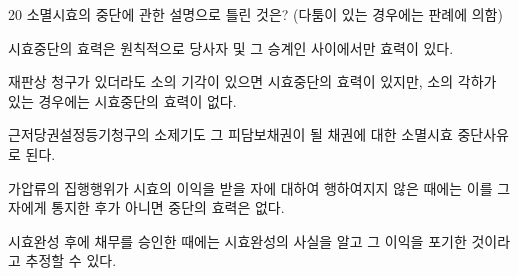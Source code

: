\begin{question}{20}
소멸시효의 중단에 관한 설명으로 틀린 것은? (다툼이 있는 경우에는 판례에 의함)
\begin{choices}
  \item 시효중단의 효력은 원칙적으로 당사자 및 그 승계인 사이에서만 효력이 있다.
  \item 재판상 청구가 있더라도 소의 기각이 있으면 시효중단의 효력이 있지만, 소의 각하가 있는 경우에는 시효중단의 효력이 없다.
  \item 근저당권설정등기청구의 소제기도 그 피담보채권이 될 채권에 대한 소멸시효 중단사유로 된다.
  \item 가압류의 집행행위가 시효의 이익을 받을 자에 대하여 행하여지지 않은 때에는 이를 그 자에게 통지한 후가 아니면 중단의 효력은 없다.
  \item 시효완성 후에 채무를 승인한 때에는 시효완성의 사실을 알고 그 이익을 포기한 것이라고 추정할 수 있다.
\end{choices}
\end{question}
